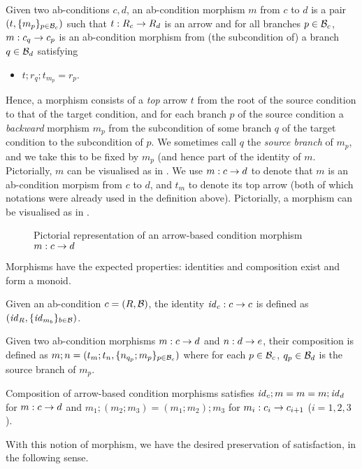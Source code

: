 \begin{definition}
  Given two ab-conditions $c,d$, an ab-condition morphism $m$ from $c$ to $d$ is a pair $(t,\{{m_p}\}_{p\in \mathcal{B}_c})$ such that $t:R_c\rightarrow R_d$ is an arrow and for all branches $p\in \mathcal{B}_c$, $m:c_q\rightarrow c_p$ is an ab-condition morphism from (the subcondition of) a branch $q\in \mathcal{B}_d$ satisfying
  \begin{itemize}
  \item $t;r_q;t_{m_p}=r_p$.
  \end{itemize}
\end{definition}
%
Hence, a morphism consists of a \emph{top} arrow $t$ from the root of the source condition to that of the target condition, and for each branch $p$ of the source condition a \emph{backward} morphism $m_p$ from the subcondition of some branch $q$ of the target condition to the subcondition of $p$. We sometimes call $q$ the \emph{source branch} of $m_p$, and we take this to be fixed by $m_p$ (and hence part of the identity of $m$. Pictorially, $m$ can be visualised as in . We use $m:c\rightarrow d$ to denote that $m$ is an ab-condition morpism from $c$ to $d$, and $t_m$ to denote its top arrow (both of which notations were already used in the definition above). Pictorially, a morphism can be visualised as in .
%
\begin{figure}
  \centering
  
  \caption{Pictorial representation of an arrow-based condition morphism $m:c\rightarrow d$}
\end{figure}

\medskip\noindent Morphisms have the expected properties: identities and composition exist and form a monoid.
%
\begin{definition}
  Given an ab-condition $c=(R,\mathcal{B})$, the identity $\mathit{id}_c:c\rightarrow c$ is defined as $(\mathit{id}_R,\{{\mathit{id}_{m_b}}\}_{b\in \mathcal{B}})$.
\end{definition}

\begin{definition}
Given two ab-condition morphisms $m:c\rightarrow d$ and $n:d\rightarrow e$, their composition is defined as $m;n=(t_m;t_n,\{{n_{q_p};m_p}\}_{p\in \mathcal{B}_c})$ where for each $p\in \mathcal{B}_c$, $q_p\in \mathcal{B}_d$ is the source branch of $m_p$.
\end{definition}

\begin{proposition}
  Composition of arrow-based condition morphisms satisfies $\mathit{id}_c;m=m=m;\mathit{id}_d$ for $m:c\rightarrow d$ and $m_1;(m_2;m_3)=(m_1;m_2);m_3$ for $m_i:c_i\rightarrow c_{i+1}$ ($i=1,2,3$).
\end{proposition}
%
With this notion of morphism, we have the desired preservation of satisfaction, in the following sense.

